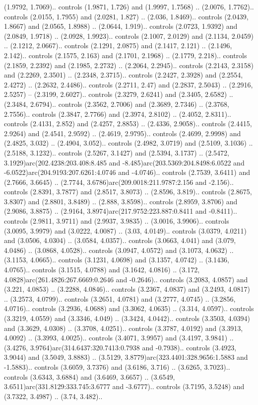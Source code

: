\begin{scope}[draw=black,line width=0.0422cm,miter limit=10.0]
(1.9792, 1.7069).. controls (1.9871, 1.726) and (1.9997, 1.7568) .. (2.0076, 1.7762).. controls (2.0155, 1.7955) and (2.0281, 1.827) .. (2.036, 1.8469).. controls (2.0439, 1.8667) and (2.0565, 1.8988) .. (2.0644, 1.919).. controls (2.0723, 1.9392) and (2.0849, 1.9718) .. (2.0928, 1.9923).. controls (2.1007, 2.0129) and (2.1134, 2.0459) .. (2.1212, 2.0667).. controls (2.1291, 2.0875) and (2.1417, 2.121) .. (2.1496, 2.142).. controls (2.1575, 2.163) and (2.1701, 2.1968) .. (2.1779, 2.218).. controls (2.1859, 2.2392) and (2.1985, 2.2732) .. (2.2064, 2.2945).. controls (2.2143, 2.3158) and (2.2269, 2.3501) .. (2.2348, 2.3715).. controls (2.2427, 2.3928) and (2.2554, 2.4272) .. (2.2632, 2.4486).. controls (2.2711, 2.47) and (2.2837, 2.5043) .. (2.2916, 2.5257) -- (2.3199, 2.6027).. controls (2.3279, 2.6241) and (2.3405, 2.6582) .. (2.3484, 2.6794).. controls (2.3562, 2.7006) and (2.3689, 2.7346) .. (2.3768, 2.7556).. controls (2.3847, 2.7766) and (2.3974, 2.8102) .. (2.4052, 2.8311).. controls (2.4131, 2.852) and (2.4257, 2.8853) .. (2.4336, 2.9058).. controls (2.4415, 2.9264) and (2.4541, 2.9592) .. (2.4619, 2.9795).. controls (2.4699, 2.9998) and (2.4825, 3.032) .. (2.4904, 3.052).. controls (2.4982, 3.0719) and (2.5109, 3.1036) .. (2.5188, 3.1232).. controls (2.5267, 3.1427) and (2.5394, 3.1737) .. (2.5472, 3.1929)arc(202.4238:203.408:8.485 and -8.485)arc(203.5369:204.8498:6.0522 and -6.0522)arc(204.9193:207.6261:4.0746 and -4.0746).. controls (2.7539, 3.6411) and (2.7666, 3.6645) .. (2.7744, 3.6786)arc(209.0018:211.9787:2.156 and -2.156).. controls (2.8391, 3.7877) and (2.8517, 3.8073) .. (2.8596, 3.819).. controls (2.8675, 3.8307) and (2.8801, 3.8489) .. (2.888, 3.8598).. controls (2.8959, 3.8706) and (2.9086, 3.8875) .. (2.9164, 3.8974)arc(217.9752:223.887:0.8411 and -0.8411).. controls (2.9811, 3.9711) and (2.9937, 3.9835) .. (3.0016, 3.9906).. controls (3.0095, 3.9979) and (3.0222, 4.0087) .. (3.03, 4.0149).. controls (3.0379, 4.0211) and (3.0506, 4.0304) .. (3.0584, 4.0357).. controls (3.0663, 4.041) and (3.079, 4.0486) .. (3.0868, 4.0528).. controls (3.0947, 4.0572) and (3.1073, 4.0632) .. (3.1153, 4.0665).. controls (3.1231, 4.0698) and (3.1357, 4.0742) .. (3.1436, 4.0765).. controls (3.1515, 4.0788) and (3.1642, 4.0816) .. (3.172, 4.0828)arc(261.4826:267.6669:0.2646 and -0.2646).. controls (3.2083, 4.0857) and (3.221, 4.0853) .. (3.2288, 4.0846).. controls (3.2367, 4.0837) and (3.2493, 4.0817) .. (3.2573, 4.0799).. controls (3.2651, 4.0781) and (3.2777, 4.0745) .. (3.2856, 4.0716).. controls (3.2936, 4.0688) and (3.3062, 4.0635) .. (3.314, 4.0597).. controls (3.3219, 4.0559) and (3.3346, 4.049) .. (3.3424, 4.0442).. controls (3.3503, 4.0394) and (3.3629, 4.0308) .. (3.3708, 4.0251).. controls (3.3787, 4.0192) and (3.3913, 4.0092) .. (3.3993, 4.0025).. controls (3.4071, 3.9957) and (3.4197, 3.9841) .. (3.4276, 3.9764)arc(314.6437:320.7413:0.7938 and -0.7938).. controls (3.4923, 3.9044) and (3.5049, 3.8883) .. (3.5129, 3.8779)arc(323.4401:328.9656:1.5883 and -1.5883).. controls (3.6059, 3.7376) and (3.6186, 3.716) .. (3.6265, 3.7023).. controls (3.6343, 3.6884) and (3.6469, 3.6657) .. (3.6549, 3.6511)arc(331.8129:333.745:3.6777 and -3.6777).. controls (3.7195, 3.5248) and (3.7322, 3.4987) .. (3.74, 3.482).. 
\end{scope}
